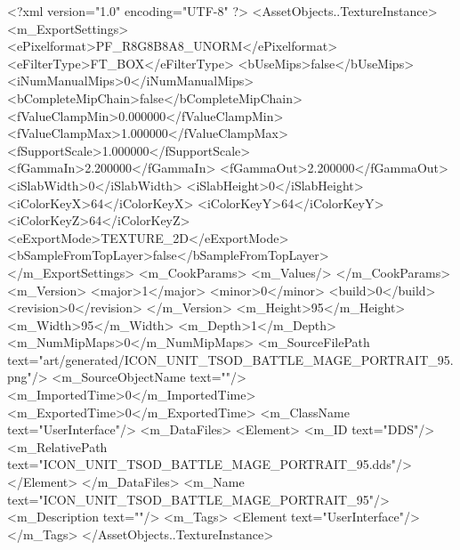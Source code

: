 <?xml version="1.0" encoding="UTF-8" ?>
<AssetObjects..TextureInstance>
	<m_ExportSettings>
		<ePixelformat>PF_R8G8B8A8_UNORM</ePixelformat>
		<eFilterType>FT_BOX</eFilterType>
		<bUseMips>false</bUseMips>
		<iNumManualMips>0</iNumManualMips>
		<bCompleteMipChain>false</bCompleteMipChain>
		<fValueClampMin>0.000000</fValueClampMin>
		<fValueClampMax>1.000000</fValueClampMax>
		<fSupportScale>1.000000</fSupportScale>
		<fGammaIn>2.200000</fGammaIn>
		<fGammaOut>2.200000</fGammaOut>
		<iSlabWidth>0</iSlabWidth>
		<iSlabHeight>0</iSlabHeight>
		<iColorKeyX>64</iColorKeyX>
		<iColorKeyY>64</iColorKeyY>
		<iColorKeyZ>64</iColorKeyZ>
		<eExportMode>TEXTURE_2D</eExportMode>
		<bSampleFromTopLayer>false</bSampleFromTopLayer>
	</m_ExportSettings>
	<m_CookParams>
		<m_Values/>
	</m_CookParams>
	<m_Version>
		<major>1</major>
		<minor>0</minor>
		<build>0</build>
		<revision>0</revision>
	</m_Version>
	<m_Height>95</m_Height>
	<m_Width>95</m_Width>
	<m_Depth>1</m_Depth>
	<m_NumMipMaps>0</m_NumMipMaps>
	<m_SourceFilePath text="art/generated/ICON_UNIT_TSOD_BATTLE_MAGE_PORTRAIT_95.png"/>
	<m_SourceObjectName text=""/>
	<m_ImportedTime>0</m_ImportedTime>
	<m_ExportedTime>0</m_ExportedTime>
	<m_ClassName text="UserInterface"/>
	<m_DataFiles>
		<Element>
			<m_ID text="DDS"/>
			<m_RelativePath text="ICON_UNIT_TSOD_BATTLE_MAGE_PORTRAIT_95.dds"/>
		</Element>
	</m_DataFiles>
	<m_Name text="ICON_UNIT_TSOD_BATTLE_MAGE_PORTRAIT_95"/>
	<m_Description text=""/>
	<m_Tags>
		<Element text="UserInterface"/>
	</m_Tags>
</AssetObjects..TextureInstance>
